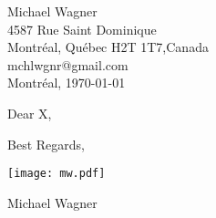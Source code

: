 \documentclass[11pt]{article}
\begin{document}
\parindent 0cm \parskip 12pt \thispagestyle{empty}


{\footnotesize Michael Wagner}\\
{\footnotesize 4587 Rue Saint Dominique}\\ 
{\footnotesize Montr\'eal, Qu\'ebec H2T 1T7,Canada}\\ 
{\footnotesize mchlwgnr@gmail.com}\\  

\medskip
\vspace{25pt}
\hfill
Montr\'eal, \today 
\vspace{35pt}
\medskip


Dear X,\\





{\vspace*{25pt}
Best Regards,

\vspace*{2pt} {\texttt{[image: mw.pdf]}}} \medskip \smallskip


\nopagebreak
   
\vspace*{-10pt} 
Michael Wagner

\vfill
\end{document}
